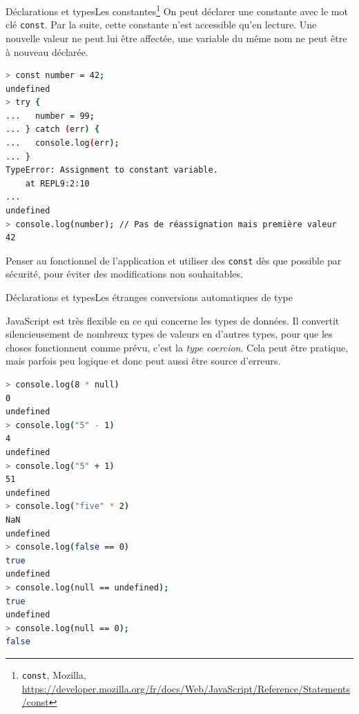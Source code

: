 \documentclass{beamer}
\begin{document}
    \begin{frame}[fragile]{Déclarations et types}{Les constantes\footnote{\lstinline{const}, Mozilla, \url{https://developer.mozilla.org/fr/docs/Web/JavaScript/Reference/Statements/const}}}
        On peut déclarer une constante avec le mot clé \lstinline{const}.
        Par la suite, cette constante n'est accessible qu'en lecture.
        Une nouvelle valeur ne peut lui être affectée, une variable du même nom ne peut être à nouveau déclarée.
        \begin{lstlisting}[language=Bash,basicstyle=\tiny\ttfamily]
> const number = 42;
undefined
> try {
...   number = 99;
... } catch (err) {
...   console.log(err);
... }
TypeError: Assignment to constant variable.
    at REPL9:2:10
...
undefined
> console.log(number); // Pas de réassignation mais première valeur
42
        \end{lstlisting}
        \begin{dangercolorbox}
            Penser au fonctionnel de l'application et utiliser des \lstinline{const} dès que possible par sécurité, pour éviter des modifications non souhaitables.
        \end{dangercolorbox}
    \end{frame}

    \begin{frame}[fragile]{Déclarations et types}{Les étranges conversions automatiques de type}
        \begin{footnotesize}
            JavaScript est très flexible en ce qui concerne les types de données.
            Il convertit silencieusement de nombreux types de valeurs en d'autres types, pour que les choses fonctionnent comme prévu, c'est la \textit{type coercion}.
            Cela peut être pratique, mais parfois peu logique et donc peut aussi être source d'erreurs.
        \end{footnotesize}
        \begin{lstlisting}[language=Bash,basicstyle=\tiny\ttfamily]
> console.log(8 * null)
0
undefined
> console.log("5" - 1)
4
undefined
> console.log("5" + 1)
51
undefined
> console.log("five" * 2)
NaN
undefined
> console.log(false == 0)
true
undefined
> console.log(null == undefined);
true
undefined
> console.log(null == 0);
false
        \end{lstlisting}
    \end{frame}
\end{document}
